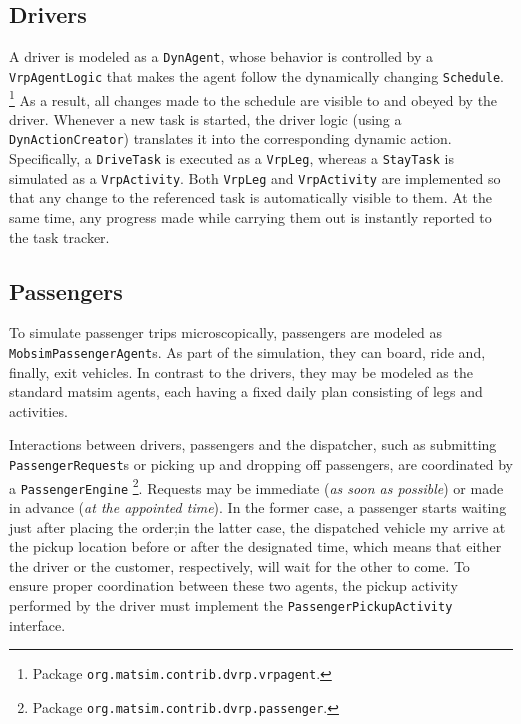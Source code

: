 \subsection{Drivers}
\label{sec:VRP-agent}
A driver is modeled as a \lstinline$DynAgent$, whose behavior is controlled by a \lstinline$VrpAgentLogic$
that makes the agent follow the dynamically changing \lstinline$Schedule$.%
\footnote{
Package \lstinline$org.matsim.contrib.dvrp.vrpagent$.
}
As a result, all changes made to the schedule are visible to and obeyed by the driver. Whenever a new task is started, the driver logic (using a \lstinline$DynActionCreator$) translates it into the corresponding dynamic action. Specifically, a \lstinline$DriveTask$ is executed as a \lstinline$VrpLeg$, whereas a \lstinline$StayTask$ is simulated as a \lstinline$VrpActivity$. Both \lstinline$VrpLeg$ and \lstinline$VrpActivity$ are implemented so that any change to the referenced task is automatically visible to them. At the same time, any progress made while carrying them out is instantly reported to the task tracker.

\subsection{Passengers}
\label{sec:VRP-passengers}
To simulate passenger trips microscopically, passengers are modeled as \lstinline$MobsimPassengerAgent$s. As part of the simulation, they can board, ride and, finally, exit vehicles. In contrast to the drivers, they may be modeled as the standard \gls{matsim} agents, each having a fixed daily plan consisting of legs and activities.

Interactions between drivers, passengers and the dispatcher, such as submitting \lstinline$PassengerRequest$s or picking up and dropping off passengers, are coordinated by a \lstinline{PassengerEngine}%
\footnote{
Package \lstinline$org.matsim.contrib.dvrp.passenger$.
}.
Requests may be immediate (\emph{as soon as possible}) or made in advance (\emph{at the appointed time}). In the former case, a passenger starts waiting just after placing the order;in the latter case, the dispatched vehicle my arrive at the pickup location before or after the designated time, which means that either the driver or the customer, respectively, will wait for the other to come. To ensure proper coordination between these two agents, the pickup activity performed by the driver must implement the \lstinline$PassengerPickupActivity$ interface.

